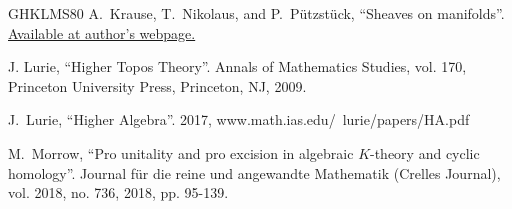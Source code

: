 \documentclass[11pt,leqno]{amsart}
\numberwithin{equation}{section}
\begin{document}
\begin{thebibliography}{GHKLMS80}
A.~Krause, T.~Nikolaus, and P.~P\"utzst\"uck, ``Sheaves on manifolds''.
\href{https://www.uni-muenster.de/IVV5WS/WebHop/user/nikolaus/Papers/sheaves-on-manifolds.pdf}{Available at author’s webpage.}




 J. Lurie, ``Higher Topos Theory''. Annals of Mathematics Studies, vol. 170, Princeton
University Press, Princeton, NJ, 2009.


 J.~Lurie, ``Higher Algebra''. 2017, www.math.ias.edu/~lurie/papers/HA.pdf



 M.~Morrow, ``Pro unitality and pro excision in algebraic $K$-theory and cyclic homology''. Journal f\"ur die reine und angewandte Mathematik (Crelles Journal), vol. 2018, no. 736, 2018, pp. 95-139.





\end{thebibliography}
\end{document}
